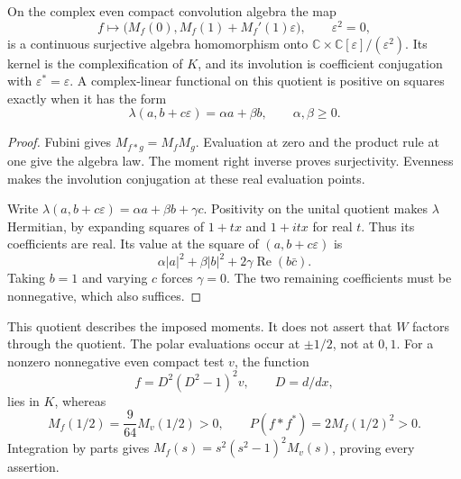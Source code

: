 \begin{proposition}
\label{v4-arith:weil:prop:moment-quotient}
On the complex even compact convolution algebra the map
\begin{equation}
 f\longmapsto\bigl(M_f(0),M_f(1)+M_f'(1)\varepsilon\bigr),
 \qquad \varepsilon^2=0,
 \label{v4-arith:weil:eq:moment-quotient}
\end{equation}
is a continuous surjective algebra homomorphism onto
\(\mathbb C\times\mathbb C[\varepsilon]/(\varepsilon^2)\).
Its kernel is the complexification of \(K\), and its involution is
coefficient conjugation with \(\varepsilon^*=\varepsilon\).
A complex-linear functional on this quotient is positive on squares
exactly when it has the form
\[
 \lambda(a,b+c\varepsilon)=\alpha a+\beta b,
 \qquad \alpha,\beta\ge0.
\]
\end{proposition}
\begin{proof}
Fubini gives \(M_{f*g}=M_fM_g\). Evaluation at zero and the product
rule at one give the algebra law. The moment right inverse proves
surjectivity. Evenness makes the involution conjugation at these real
evaluation points.

Write \(\lambda(a,b+c\varepsilon)=\alpha a+\beta b+\gamma c\).
Positivity on the unital quotient makes \(\lambda\) Hermitian, by
expanding squares of \(1+t x\) and \(1+itx\) for real \(t\).
Thus its coefficients are real. Its value at the square of
\((a,b+c\varepsilon)\) is
\[
 \alpha|a|^2+\beta|b|^2+2\gamma\operatorname{Re}(b\bar c).
\]
Taking \(b=1\) and varying \(c\) forces \(\gamma=0\).
The two remaining coefficients must be nonnegative, which also suffices.
\end{proof}

This quotient describes the imposed moments. It does not assert that
\(W\) factors through the quotient. The polar evaluations occur at
\(\pm1/2\), not at \(0,1\). For a nonzero nonnegative even compact
test \(v\), the function
\[
 f=D^2(D^2-1)^2v,\qquad D=d/dx,
\]
lies in \(K\), whereas
\[
 M_f(1/2)=\frac9{64}M_v(1/2)>0,
 \qquad P(f*f^*)=2M_f(1/2)^2>0.
\]
Integration by parts gives
\(M_f(s)=s^2(s^2-1)^2M_v(s)\), proving every assertion.

